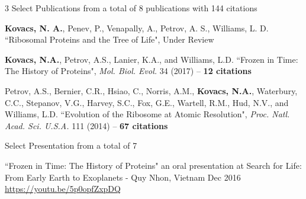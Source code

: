 

\begin{cventries}

  \cventry
  	{3 Select Publications from a total of 8 publications with 144 citations} %
    {} %
    {} %
    {} %
    {\begin{cvitems}
    \item {\bf Kovacs, N. A.}, Penev, P., Venapally, A., Petrov, A. S., Williams, L. D. ``Ribosomal Proteins and the Tree of Life", Under Review
    \item {\bf Kovacs, N.A.}, Petrov, A.S., Lanier, K.A., and Williams, L.D. ``Frozen in Time: The History of Proteins", \textit{Mol. Biol. Evol.} 34 (2017) -- {\bf 12 citations}
    \item Petrov, A.S., Bernier, C.R., Hsiao, C., Norris, A.M., {\bf Kovacs, N.A.}, Waterbury, C.C., Stepanov, V.G., Harvey, S.C., Fox, G.E., Wartell, R.M., Hud, N.V., and Williams, L.D. ``Evolution of the Ribosome at Atomic Resolution", \textit{Proc. Natl. Acad. Sci. U.S.A.} 111 (2014) -- {\bf 67 citations}
    \end{cvitems}
    }
    
  \cventry
  	{Select Presentation from a total of 7} %
    {} %
    {} %
    {} %
    {\begin{cvitems}
    \item ``Frozen in Time: The History of Proteins" an oral presentation at Search for Life: From Early Earth to Exoplanets - Quy Nhon, Vietnam Dec 2016 \\ \href{https://youtu.be/5p0opfZxpDQ}{https://youtu.be/5p0opfZxpDQ}
    \end{cvitems}
    }
    
\vspace{-1em}

\end{cventries}
